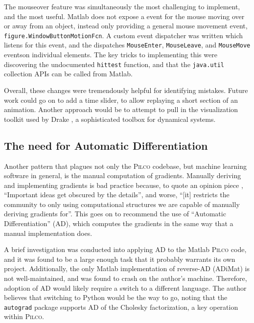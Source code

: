 \documentclass[main.tex]{subfiles}
\begin{document}
The mouseover feature was simultaneously the most challenging to implement, and the most useful.
Matlab does not expose a event for the mouse moving over or away from an object, instead only providing a general mouse movement event, \texttt{figure.WindowButtonMotionFcn}.
A custom event dispatcher was written which listens for this event, and the dispatches \texttt{MouseEnter}, \texttt{MouseLeave}, and \texttt{MouseMove} events\footnotemark on individual elements.
The key tricks to implementing this were discovering the undocumented \texttt{hittest} function\cite{matlab-hittest}, and that the \texttt{java.util} collection APIs can be called from Matlab.


Overall, these changes were tremendously helpful for identifying mistakes.
Future work could go on to add a time slider, to allow replaying a short section of an animation. Another approach would be to attempt to pull in the visualization toolkit used by Drake \cite{drake}, a sophisticated toolbox for dynamical systems.


\subsection{The need for Automatic Differentiation}

	Another pattern that plagues not only the \textsc{Pilco} codebase, but machine learning software in general, is the manual computation of gradients.
	Manually deriving and implementing gradients is bad practice because, to quote an opinion piece \cite{ad-criminal}, \enquote{Important ideas get obscured by the details}, and worse, \enquote{[it] restricts the community to only using computational structures we are capable of manually deriving gradients for}.
	This goes on to recommend the use of \enquote{Automatic Differentiation} (AD), which computes the gradients in the same way that a manual implementation does.

	A brief investigation was conducted into applying AD to the Matlab \textsc{Pilco} code, and it was found to be a large enough task that it probably warrants its own project. Additionally, the only Matlab implementation of reverse-AD (ADiMat) is not well-maintained, and was found to crash on the author's machine.
	Therefore, adoption of AD would likely require a switch to a different language.
	The author believes that switching to Python would be the way to go\footnotemark, noting that the \texttt{autograd} \cite{autograd} package supports AD of the Cholesky factorization, a key operation within \textsc{Pilco}.


\bib
\end{document}
